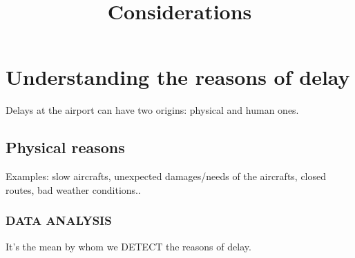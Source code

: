 \documentclass{article}
\begin{document}
	
	\title{Considerations}
	\maketitle
	
	\section*{Understanding the reasons of delay}
	Delays at the airport can have two origins: physical and human ones.
\subsection*{Physical reasons}
Examples: slow aircrafts, unexpected damages/needs of the aircrafts, closed routes, bad weather conditions..

\subsubsection*{DATA ANALYSIS }
It's the mean by whom we DETECT the reasons of delay.
\end{document}

